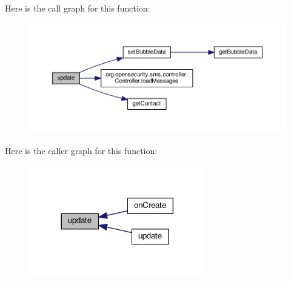 Here is the call graph for this function\+:
\nopagebreak
\begin{figure}[H]
\begin{center}
\leavevmode
\includegraphics[width=350pt]{a00007_ac5c54df7ed3b930268c8d7752c101725_cgraph}
\end{center}
\end{figure}




Here is the caller graph for this function\+:
\nopagebreak
\begin{figure}[H]
\begin{center}
\leavevmode
\includegraphics[width=218pt]{a00007_ac5c54df7ed3b930268c8d7752c101725_icgraph}
\end{center}
\end{figure}




